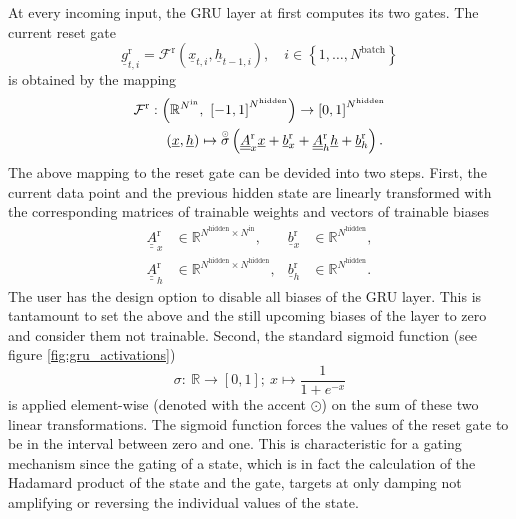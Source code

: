 At every incoming input, the GRU layer at first computes its two gates.
The current reset gate 
\begin{equation}
    \underline g^\text{r}_{t,i} 
    =
    \mathcal{F}^\text{r} \left( \underline x_{t,i}, \underline h_{t-1,i}\right)
    ,\quad i \in \left\{1, \dots, N^\text{batch}\right\}
\end{equation}
is obtained 
by the mapping
\begin{align} \label{eq:gru_reset}
    \mathcal{F}^\text{r}
    &:
    \left(\mathbb{R}^{N^\text{in}},\ \left[-1, 1\right]^{N^\text{hidden}}\right)
    \rightarrow
    \left[0, 1\right]^{N^\text{hidden}}
    \nonumber \\ & \quad
    \left(\underline x,\underline h\right)
    \mapsto
    \overset{\scriptscriptstyle \odot}{\sigma} \left(
        \underline{\underline A}^\text{r}_{x} \underline x
        +
        \underline b^\text{r}_{x}
        +
        \underline{\underline A}^\text{r}_{h} \underline h
        +
        \underline b^\text{r}_{h}
    \right).
\end{align}
The above mapping to the reset gate can be devided into two steps. 
First, the current data point 
and the previous hidden state
are linearly transformed 
with the corresponding matrices of trainable weights 
and vectors of trainable biases
\begin{align} \label{eq:gru_reset_params}
    \underline{\underline A}^\text{r}_{x} & \in \mathbb{R}^{
        N^\text{hidden}
        \times
        N^\text{in}
    },
    & \underline{b}^\text{r}_{x} & \in \mathbb{R}^{N^\text{hidden}},
    \nonumber \\
    \underline{\underline A}^\text{r}_{h} & \in \mathbb{R}^{
        N^\text{hidden}
        \times
        N^\text{hidden}
    },
    & \underline{b}^\text{r}_{h} & \in \mathbb{R}^{N^\text{hidden}}.
\end{align}
The user has the design option to disable all biases of the GRU layer.
This is tantamount to set the above and the still upcoming biases of the layer 
to zero and consider them not trainable.
Second, the standard sigmoid function \cite{Han1995} (see figure \ref{fig:gru_activations})
\begin{equation}
    \sigma :\ 
    \mathbb{R} \rightarrow \left[0,1\right] ;\ 
    x \mapsto \frac{1}{1 + e^{-x}}
\end{equation}
is applied element-wise (denoted with the accent $\odot$) 
on the sum of these two linear transformations.
The sigmoid function forces the values of the reset gate to be 
in the interval between zero and one.
This is characteristic for a gating mechanism
since the gating of a state,
which is in fact the calculation of the Hadamard product
of the state and the gate,
targets at only damping 
not amplifying or reversing
the individual values of the state.

